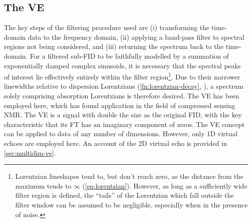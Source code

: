 \subsection{The \acl{VE}}
\label{subsec:ve}
The key steps of the filtering procedure used are
(i) transforming the time-domain data to the frequency domain,
(ii) applying a band-pass filter to spectral regions not being considered, and
(iii) returning the spectrum back to the time-domain.
For a filtered sub-\ac{FID} to be faithfully modelled by a
summation of exponentially damped complex sinusoids, it is necessary that the
spectral peaks of interest lie effectively entirely within the filter
region\footnote{
    Lorentzian lineshapes tend to, but don't reach zero, as the distance from
    the maximum tends to $\infty$ (\cref{eq:lorentzian}). However, as long as a
    sufficiently wide filter region is defined, the ``tails'' of the Lorentzian
    which fall outside the filter window can be assumed to be negligible,
    especially when in the presence of noise.
}.
Due to their narrower linewidths relative to dispersion Lorentzians
(\cref{fn:lorentzian-decay}, ), a spectrum solely
comprising absorption Lorentzians is therefore desired.
The \ac{VE} has been employed here, which has found application in the field of
compressed sensing NMR\cite{Mayzel2014,Golowicz2020,Luo2020}. The \ac{VE} is a
signal with double the size as the original \ac{FID}, with the key
characteristic that its \ac{FT} has an imaginary component of zeros. The
\ac{VE} concept can be applied to data of any number of dimensions. However,
only \ac{1D} virtual echoes are employed here.
An account of the \ac{2D} virtual echo is provided in \cref{sec:multidim-ve}.

